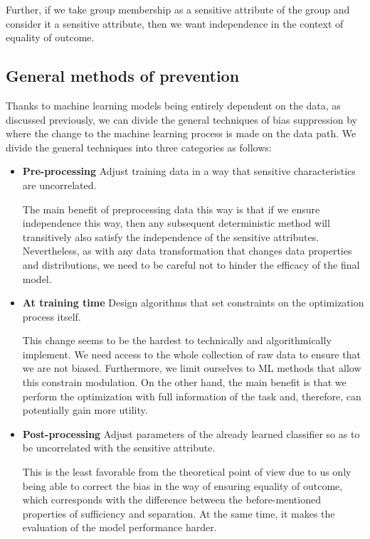 Further, if we take group membership as a sensitive attribute of the group and consider it a sensitive attribute, then we want independence in the context of equality of outcome.

\subsection{General methods of prevention}
Thanks to machine learning models being entirely dependent on the data, as discussed previously, we can divide the general techniques of bias suppression by where the change to the machine learning process is made on the data path. We divide the general techniques into three categories as follows:
\begin{itemize}

    \item \textbf{Pre-processing}
    Adjust training data in a way that sensitive characteristics are uncorrelated. 
    
    The main benefit of preprocessing data this way is that if we ensure independence this way, then any subsequent deterministic method will transitively also satisfy the independence of the sensitive attributes.
    Nevertheless, as with any data transformation that changes data properties and distributions, we need to be careful not to hinder the efficacy of the final model.
    
    \item \textbf{At training time}
    Design algorithms that set constraints on the optimization process itself.
    
    This change seems to be the hardest to technically and algorithmically implement. We need access to the whole collection of raw data to ensure that we are not biased. Furthermore, we limit ourselves to ML methods that allow this constrain modulation. On the other hand, the main benefit is that we perform the optimization with full information of the task and, therefore, can potentially gain more utility.
    
    
    \item \textbf{Post-processing}
    Adjust parameters of the already learned classifier so as to be uncorrelated with the sensitive attribute.
    
    This is the least favorable from the theoretical point of view due to us only being able to correct the bias in the way of ensuring equality of outcome, which corresponds with the difference between the before-mentioned properties of sufficiency and separation. At the same time, it makes the evaluation of the model performance harder.
\end{itemize}


